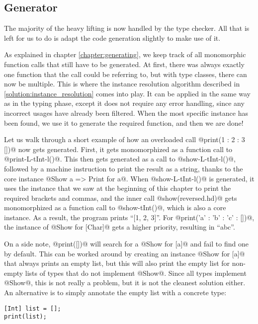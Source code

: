 \subsection{Generator}
The majority of the heavy lifting is now handled by the type checker. All that is left for us to do is adapt the code generation slightly to make use of it.

As explained in chapter \ref{chapter:generating}, we keep track of all monomorphic function calls that still have to be generated. At first, there was always exactly one function that the call could be referring to, but with type classes, there can now be multiple. This is where the instance resolution algorithm described in \ref{solution:instance_resolution} comes into play. It can be applied in the same way as in the typing phase, except it does not require any error handling, since any incorrect usages have already been filtered. When the most specific instance has been found, we use it to generate the required function, and then we are done!

Let us walk through a short example of how an overloaded call @print(1 : 2 : 3 [])@ now gets generated. First, it gets monomorphized as a function call to @print-L-tInt-l()@. This then gets generated as a call to @show-L-tInt-l()@, followed by a machine instruction to print the result as a string, thanks to the core instance @Show a => Print for a@. When @show-L-tInt-l()@ is generated, it uses the instance that we saw at the beginning of this chapter to print the required brackets and commas, and the inner call @show(reversed.hd)@ gets monomorphized as a function call to @show-tInt()@, which is also a core instance. As a result, the program prints ``[1, 2, 3]''. For @print('a' : 'b' : 'c' : [])@, the instance of @Show for [Char]@ gets a higher priority, resulting in ``abc''.

On a side note, @print([])@ will search for a @Show for [a]@ and fail to find one by default. This can be worked around by creating an instance @Show for [a]@ that always prints an empty list, but this will also print the empty list for non-empty lists of types that do not implement @Show@. Since all types implement @Show@, this is not really a problem, but it is not the cleanest solution either. An alternative is to simply annotate the empty list with a concrete type:

\begin{lstlisting}
[Int] list = [];
print(list);
\end{lstlisting}

